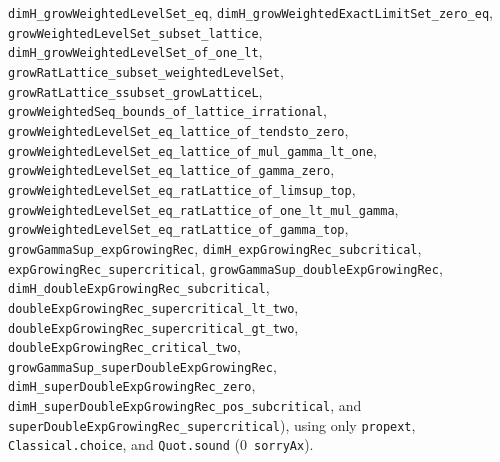 \texttt{dimH\_\allowbreak grow\allowbreak Weighted\allowbreak LevelSet\_\allowbreak eq},
\texttt{dimH\_\allowbreak grow\allowbreak Weighted\allowbreak ExactLimitSet\_\allowbreak zero\_\allowbreak eq},
\texttt{grow\allowbreak Weighted\allowbreak LevelSet\_\allowbreak subset\_\allowbreak lattice},
\texttt{dimH\_\allowbreak grow\allowbreak Weighted\allowbreak LevelSet\_\allowbreak of\_\allowbreak one\_\allowbreak lt},
\texttt{grow\allowbreak RatLattice\_\allowbreak subset\_\allowbreak weightedLevelSet},
\texttt{grow\allowbreak RatLattice\_\allowbreak ssubset\_\allowbreak growLatticeL},
\texttt{grow\allowbreak Weighted\allowbreak Seq\_\allowbreak bounds\_\allowbreak of\_\allowbreak lattice\_\allowbreak irrational},
\texttt{grow\allowbreak Weighted\allowbreak LevelSet\_\allowbreak eq\_\allowbreak lattice\_\allowbreak of\_\allowbreak tendsto\_\allowbreak zero},
\texttt{grow\allowbreak Weighted\allowbreak LevelSet\_\allowbreak eq\_\allowbreak lattice\_\allowbreak of\_\allowbreak mul\_\allowbreak gamma\_\allowbreak lt\_\allowbreak one},
\texttt{grow\allowbreak Weighted\allowbreak LevelSet\_\allowbreak eq\_\allowbreak lattice\_\allowbreak of\_\allowbreak gamma\_\allowbreak zero},
\texttt{grow\allowbreak Weighted\allowbreak LevelSet\_\allowbreak eq\_\allowbreak ratLattice\_\allowbreak of\_\allowbreak limsup\_\allowbreak top},
\texttt{grow\allowbreak Weighted\allowbreak LevelSet\_\allowbreak eq\_\allowbreak ratLattice\_\allowbreak of\_\allowbreak one\_\allowbreak lt\_\allowbreak mul\_\allowbreak gamma},
\texttt{grow\allowbreak Weighted\allowbreak LevelSet\_\allowbreak eq\_\allowbreak ratLattice\_\allowbreak of\_\allowbreak gamma\_\allowbreak top},
\texttt{growGammaSup\_\allowbreak exp\allowbreak Growing\allowbreak Rec},
\texttt{dimH\_\allowbreak exp\allowbreak Growing\allowbreak Rec\_\allowbreak sub\allowbreak critical},
\texttt{exp\allowbreak Growing\allowbreak Rec\_\allowbreak super\allowbreak critical},
\texttt{growGammaSup\_\allowbreak double\allowbreak Exp\allowbreak Growing\allowbreak Rec},
\texttt{dimH\_\allowbreak double\allowbreak Exp\allowbreak Growing\allowbreak Rec\_\allowbreak sub\allowbreak critical},
\texttt{double\allowbreak Exp\allowbreak Growing\allowbreak Rec\_\allowbreak super\allowbreak critical\_\allowbreak lt\_\allowbreak two},
\texttt{double\allowbreak Exp\allowbreak Growing\allowbreak Rec\_\allowbreak super\allowbreak critical\_\allowbreak gt\_\allowbreak two},
\texttt{double\allowbreak Exp\allowbreak Growing\allowbreak Rec\_\allowbreak critical\_\allowbreak two},
\texttt{growGammaSup\_\allowbreak super\allowbreak Double\allowbreak Exp\allowbreak Growing\allowbreak Rec},
\texttt{dimH\_\allowbreak super\allowbreak Double\allowbreak Exp\allowbreak Growing\allowbreak Rec\_\allowbreak zero},
\texttt{dimH\_\allowbreak super\allowbreak Double\allowbreak Exp\allowbreak Growing\allowbreak Rec\_\allowbreak pos\_\allowbreak sub\allowbreak critical},
and \texttt{super\allowbreak Double\allowbreak Exp\allowbreak Growing\allowbreak Rec\_\allowbreak super\allowbreak critical}), using only \texttt{propext},
\texttt{Classical.choice}, and \texttt{Quot.sound} ($0$~\texttt{sorryAx}).

